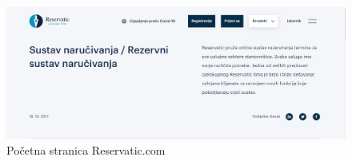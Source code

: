 \begin{figure}[H]
			             \includegraphics[width=\textwidth]{slike/slicne1.jpg}
			            \caption{Početna stranica Reservatic.com}
			            \label{fig:slicne1} %
		            \end{figure}


